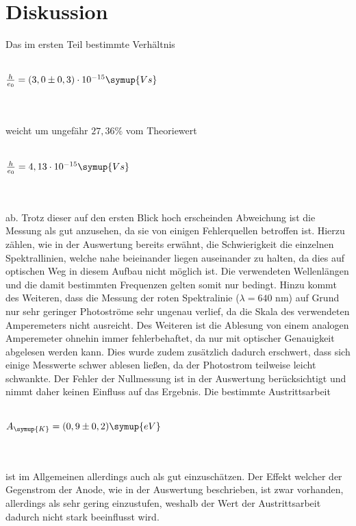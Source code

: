 \section{Diskussion}
\label{sec:Diskussion}
Das im ersten Teil bestimmte Verhältnis 
\\ \\
\centerline{$ \frac{h}{e_0} = (3,0 \pm 0,3) \cdot 10^{-15} \symup{Vs} $}
\\ \\
weicht um ungefähr $27,36\%$ vom Theoriewert
\\ \\
\centerline{$ \frac{h}{e_0} = 4,13 \cdot 10^{-15} \symup{Vs} $}
\\ \\
ab. Trotz dieser auf den ersten Blick hoch erscheinden Abweichung ist die Messung als gut anzusehen, da sie von einigen Fehlerquellen
betroffen ist. Hierzu zählen, wie in der Auswertung bereits erwähnt, die Schwierigkeit die einzelnen Spektrallinien, welche nahe beieinander 
liegen auseinander zu halten, da dies auf optischen Weg in diesem Aufbau nicht möglich ist. Die verwendeten Wellenlängen und die damit
bestimmten Frequenzen gelten somit nur bedingt. Hinzu kommt des Weiteren, dass die Messung der roten Spektralinie ($\lambda = 640$ nm) auf 
Grund nur sehr geringer Photoströme sehr ungenau verlief, da die Skala des verwendeten Amperemeters nicht ausreicht. Des Weiteren ist die 
Ablesung von einem analogen Amperemeter ohnehin immer fehlerbehaftet, da nur mit optischer Genauigkeit abgelesen werden kann. Dies wurde zudem
zusätzlich dadurch erschwert, dass sich einige Messwerte schwer ablesen ließen, da der Photostrom teilweise leicht schwankte.
Der Fehler der Nullmessung ist in der Auswertung berücksichtigt und nimmt daher keinen Einfluss auf das Ergebnis.
Die bestimmte Austrittsarbeit
\\ \\
\centerline{$A_{\symup{K}} = (0,9 \pm 0,2) \symup{eV}$}
\\ \\
ist im Allgemeinen allerdings auch als gut einzuschätzen. Der Effekt welcher der Gegenstrom der Anode, wie in der Auswertung beschrieben, ist zwar 
vorhanden, allerdings als sehr gering einzustufen, weshalb der Wert der Austrittsarbeit dadurch nicht stark beeinflusst wird.